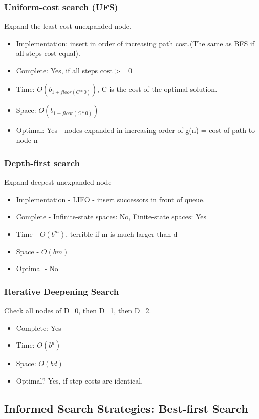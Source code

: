 \documentclass[11pt, oneside]{article}   	%
\begin{document}
\subsubsection{Uniform-cost search (UFS)}
Expand the least-cost unexpanded node.
\begin{itemize}
\item Implementation: insert in order of increasing path cost.(The same as BFS if all steps cost equal).
\item Complete: Yes, if all steps cost >= 0
\item Time: $O(b_{1+floor(C*0)})$, C is the cost of the optimal solution.
\item Space: $O(b_{1+floor(C*0)})$
\item Optimal: Yes - nodes expanded in increasing order of g(n) = cost of path to node n
\end{itemize}

\subsubsection{Depth-first search}
Expand deepest unexpanded node
\begin{itemize}
\item Implementation - LIFO - insert successors in front of queue.
\item Complete - Infinite-state spaces: No, Finite-state spaces: Yes
\item Time - $O(b^m)$, terrible if m is much larger than d
\item Space - $O(bm)$
\item Optimal - No
\end{itemize}
\subsubsection{Iterative Deepening Search}
Check all nodes of D=0, then D=1, then D=2.
\begin{itemize}
\item Complete: Yes
\item Time: $O(b^d)$
\item Space: $O(bd)$
\item Optimal? Yes, if step costs are identical.
\end{itemize}

\subsection{Informed Search Strategies: Best-first Search}
\end{document}
